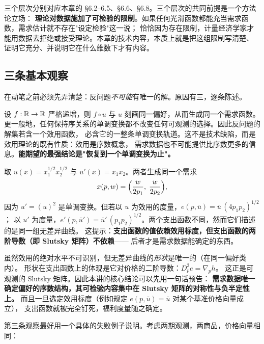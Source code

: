 三个层次分别对应本章的 \S 6.2--6.5、\S 6.6、\S 6.8。三个层次的共同前提是一个方法论立场：
\textbf{理论对数据施加了可检验的限制}。如果任何光滑函数都能充当需求函数，需求估计就不存在"设定检验"这一说；
恰恰因为存在限制，计量经济学家才能用数据去拒绝或接受理论。本章的技术内容，本质上就是把这组限制写清楚、
证明它充分、并说明它在什么维数下才有内容。

\subsection{三条基本观察}

在动笔之前必须先弄清楚：反问题\emph{不可能}有唯一的解。原因有三，逐条陈述。


设 $f:\mathbb{R}\to\mathbb{R}$ 严格递增，则 $f\circ u$ 与 $u$ 刻画同一偏好，从而生成同一个需求函数。
更一般地，任何保持序关系的单调变换都不改变任何可观测的选择。因此反问题的解集若含一个效用函数，
必含它的一整条单调变换轨道。这不是技术缺陷，而是效用理论的既有性质：效用是序数概念，
需求数据也不可能提供比序数更多的信息。\textbf{能期望的最强结论是"恢复到一个单调变换为止"。}

\begin{example}[CD 的两条等价轨道]
取 $u(x)=x_1^{1/2}x_2^{1/2}$ 与 $u'(x)=x_1x_2$。两者生成同一个需求
\[
 x(p,w)=\Bigl(\frac{w}{2p_1},\;\frac{w}{2p_2}\Bigr),
\]
因为 $u'=(u)^2$ 是单调变换。但若以 $u$ 为效用的度量，$e(p,\bar u)=\bar u\,(4p_1p_2)^{1/2}$；
以 $u'$ 为度量，$e'(p,\bar u')=\bar u'\,(p_1p_2)^{1/2}$。两个支出函数不同，然而它们描述的是同一组无差异曲线。
这提示：\textbf{支出函数的值依赖效用标度，但支出函数的两阶导数（即 Slutsky 矩阵）不依赖}——
后者才是需求数据能确定的东西。
\end{example}


虽然效用的绝对水平不可识别，但无差异曲线的\emph{形状}是唯一的（在同一偏好类内）。
形状在支出函数上的体现是它对价格的二阶导数：$D_p^2e=\nabla_p h$。
这正是可观测的 Slutsky 矩阵。因此本讲的核心结论可以先用一句话预告：
\textbf{需求数据唯一确定偏好的序数结构，其可检验内容集中在 Slutsky 矩阵的对称性与负半定性上。}
而且一旦选定效用标度（例如规定 $e(p,\bar u)=\bar u$ 对某个基准价格向量成立），
支出函数就被完全钉死，福利度量随之确定。


第三条观察最好用一个具体的失败例子说明。考虑两期观测，两商品，价格向量相同：

